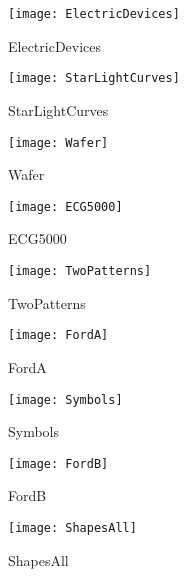 \documentclass[../../thesis.tex]{subfiles}
\begin{document}
    \begin{figure}[h]
        \label{fig:datasets}
        \centering
        \begin{minipage}[b]{0.32\textwidth}
            \centering
            \texttt{[image: ElectricDevices]}
            \caption*{ElectricDevices}
        \end{minipage}
        \hfill
        \begin{minipage}[b]{0.32\textwidth}
            \centering
            \texttt{[image: StarLightCurves]}
            \caption*{StarLightCurves}
        \end{minipage}
        \hfill
        \begin{minipage}[b]{0.32\textwidth}
            \centering
            \texttt{[image: Wafer]}
            \caption*{Wafer}
        \end{minipage}
        
        \vspace{0.4cm}
        
        \begin{minipage}[b]{0.32\textwidth}
            \centering
            \texttt{[image: ECG5000]}
            \caption*{ECG5000}
        \end{minipage}
        \hfill
        \begin{minipage}[b]{0.32\textwidth}
            \centering
            \texttt{[image: TwoPatterns]}
            \caption*{TwoPatterns}
        \end{minipage}
        \hfill
        \begin{minipage}[b]{0.32\textwidth}
            \centering
            \texttt{[image: FordA]}
            \caption*{FordA}
        \end{minipage}
        
        \vspace{0.4cm}
        
        \begin{minipage}[b]{0.32\textwidth}
            \centering
            \texttt{[image: Symbols]}
            \caption*{Symbols}
        \end{minipage}
        \hfill
        \begin{minipage}[b]{0.32\textwidth}
            \centering
            \texttt{[image: FordB]}
            \caption*{FordB}
        \end{minipage}
        \hfill
        \begin{minipage}[b]{0.32\textwidth}
            \centering
            \texttt{[image: ShapesAll]}
            \caption*{ShapesAll}
        \end{minipage}
        

\end{figure}
\end{document}
